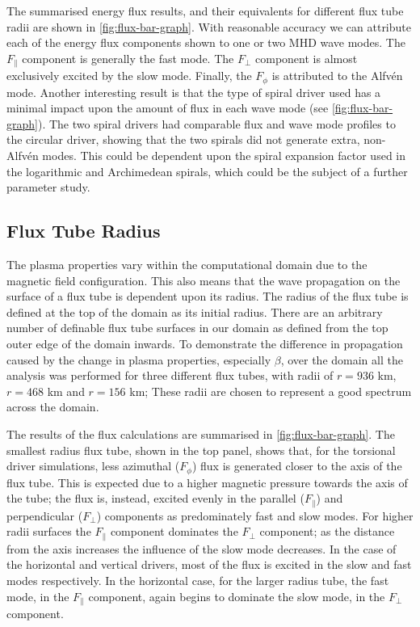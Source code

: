 \documentclass[a4paper,12pt,fourier,authoryear,custommargin]{Classes/PhDThesisPSnPDF}
\begin{document}
The summarised energy flux results, and their equivalents for different flux tube radii are shown in \cref{fig:flux-bar-graph}.
With reasonable accuracy we can attribute each of the energy flux components shown to one or two MHD wave modes.
The $F_\parallel$ component is generally the fast mode. 
The $F_\perp$ component is almost exclusively excited by the slow mode.
Finally, the $F_\phi$ is attributed to the Alfv\'en mode.
Another interesting result is that the type of spiral driver used has a minimal impact upon the amount of flux in each wave mode (see \cref{fig:flux-bar-graph}).
The two spiral drivers had comparable flux and wave mode profiles to the circular driver, showing that the two spirals did not generate extra, non-Alfv\'en modes.
This could be dependent upon the spiral expansion factor used in the logarithmic and Archimedean spirals, which could be the subject of a further parameter study.

\subsection{Flux Tube Radius}
The plasma properties vary within the computational domain due to the magnetic field configuration.
This also means that the wave propagation on the surface of a flux tube is dependent upon its radius. 
The radius of the flux tube is defined at the top of the domain as its initial radius.
There are an arbitrary number of definable flux tube surfaces in our domain as defined from the top outer edge of the domain inwards. 
To demonstrate the difference in propagation caused by the change in plasma properties, especially $\beta$, over the domain all the analysis was performed for three different flux tubes, with radii of $r=936$ km, $r=468$ km and  $r=156$ km; These radii are chosen to represent a good spectrum across the domain.

The results of the flux calculations are summarised in \cref{fig:flux-bar-graph}.
The smallest radius flux tube, shown in the top panel, shows that, for the torsional driver simulations, less azimuthal ($F_\phi$) flux is generated closer to the axis of the flux tube. 
This is expected due to a higher magnetic pressure towards the axis of the tube; the flux is, instead, excited evenly in the parallel ($F_\parallel$) and perpendicular ($F_\perp$) components as predominately fast and slow modes. 
For higher radii surfaces the $F_\parallel$ component dominates the $F_\perp$ component; as the distance from the axis increases the influence of the slow mode decreases.
In the case of the horizontal and vertical drivers, most of the flux is excited in the slow and fast modes respectively.
In the horizontal case, for the larger radius tube, the fast mode, in the $F_\parallel$ component, again begins to dominate the slow mode, in the $F_\perp$ component.
\end{document}
